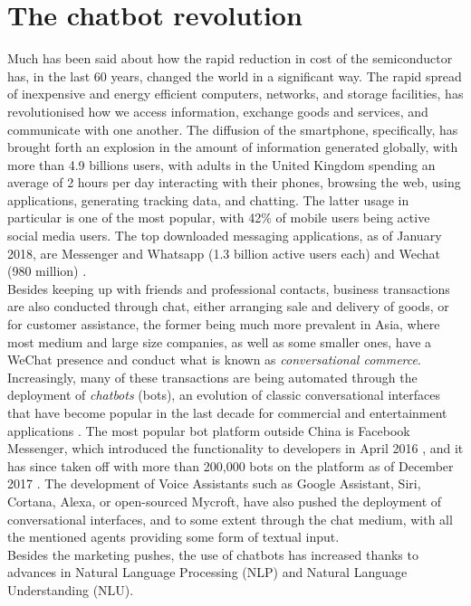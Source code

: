 \section{The chatbot revolution}
Much has been said about how the rapid reduction in cost of the semiconductor has, in the last 60 years, changed the world in a significant way. The rapid spread of inexpensive and energy efficient computers, networks, and storage facilities, has revolutionised how we access information, exchange goods and services, and communicate with one another. The diffusion of the smartphone, specifically, has brought forth an explosion in the amount of information generated globally, with more than 4.9 billions users, with adults in the United Kingdom spending an average of 2 hours per day interacting with their phones, browsing the web, using applications, generating tracking data, and chatting. The latter usage in particular is one of the most popular, with 42\% of mobile users \cite{mobilesocial} being active social media users. The top downloaded messaging applications, as of January 2018, are Messenger and Whatsapp (1.3 billion active users each) and Wechat (980 million) \cite{mobilestatista}. \\
Besides keeping up with friends and professional contacts, business transactions are also conducted through chat, either arranging sale and delivery of goods, or for customer assistance, the former being much more prevalent in Asia, where most medium and large size companies, as well as some smaller ones, have a WeChat presence and conduct what is known as \textit{conversational commerce}. Increasingly, many of these transactions are being automated through the deployment of \textit{chatbots} (bots), an evolution of classic conversational interfaces that have become popular in the last decade for commercial and entertainment applications \cite{Dale2016}. The most popular bot platform outside China is Facebook Messenger, which introduced the functionality to developers in April 2016 \cite{Messenger2016}, and it has since taken off with more than 200,000 bots on the platform as of December 2017 \cite{Messenger2017}. The development of Voice Assistants such as Google Assistant, Siri, Cortana, Alexa, or open-sourced Mycroft, have also pushed the deployment of conversational interfaces, and to some extent through the chat medium, with all the mentioned agents providing some form of textual input. \\
Besides the marketing pushes, the use of chatbots has increased thanks to advances in Natural Language Processing (NLP) and Natural Language Understanding (NLU). 
